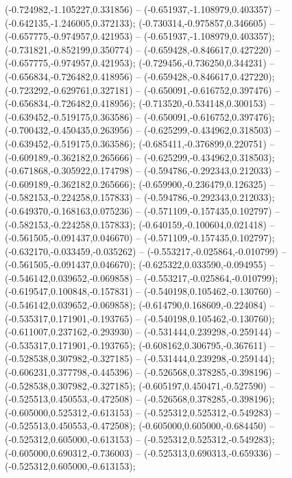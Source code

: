  (-0.724982,-1.105227,0.331856) -- (-0.651937,-1.108979,0.403357) -- (-0.642135,-1.246005,0.372133);
 (-0.730314,-0.975857,0.346605) -- (-0.657775,-0.974957,0.421953) -- (-0.651937,-1.108979,0.403357);
 (-0.731821,-0.852199,0.350774) -- (-0.659428,-0.846617,0.427220) -- (-0.657775,-0.974957,0.421953);
 (-0.729456,-0.736250,0.344231) -- (-0.656834,-0.726482,0.418956) -- (-0.659428,-0.846617,0.427220);
 (-0.723292,-0.629761,0.327181) -- (-0.650091,-0.616752,0.397476) -- (-0.656834,-0.726482,0.418956);
 (-0.713520,-0.534148,0.300153) -- (-0.639452,-0.519175,0.363586) -- (-0.650091,-0.616752,0.397476);
 (-0.700432,-0.450435,0.263956) -- (-0.625299,-0.434962,0.318503) -- (-0.639452,-0.519175,0.363586);
 (-0.685411,-0.376899,0.220751) -- (-0.609189,-0.362182,0.265666) -- (-0.625299,-0.434962,0.318503);
 (-0.671868,-0.305922,0.174798) -- (-0.594786,-0.292343,0.212033) -- (-0.609189,-0.362182,0.265666);
 (-0.659900,-0.236479,0.126325) -- (-0.582153,-0.224258,0.157833) -- (-0.594786,-0.292343,0.212033);
 (-0.649370,-0.168163,0.075236) -- (-0.571109,-0.157435,0.102797) -- (-0.582153,-0.224258,0.157833);
 (-0.640159,-0.100604,0.021418) -- (-0.561505,-0.091437,0.046670) -- (-0.571109,-0.157435,0.102797);
 (-0.632170,-0.033459,-0.035262) -- (-0.553217,-0.025864,-0.010799) -- (-0.561505,-0.091437,0.046670);
 (-0.625322,0.033590,-0.094955) -- (-0.546142,0.039652,-0.069858) -- (-0.553217,-0.025864,-0.010799);
 (-0.619547,0.100848,-0.157831) -- (-0.540198,0.105462,-0.130760) -- (-0.546142,0.039652,-0.069858);
 (-0.614790,0.168609,-0.224084) -- (-0.535317,0.171901,-0.193765) -- (-0.540198,0.105462,-0.130760);
 (-0.611007,0.237162,-0.293930) -- (-0.531444,0.239298,-0.259144) -- (-0.535317,0.171901,-0.193765);
 (-0.608162,0.306795,-0.367611) -- (-0.528538,0.307982,-0.327185) -- (-0.531444,0.239298,-0.259144);
 (-0.606231,0.377798,-0.445396) -- (-0.526568,0.378285,-0.398196) -- (-0.528538,0.307982,-0.327185);
 (-0.605197,0.450471,-0.527590) -- (-0.525513,0.450553,-0.472508) -- (-0.526568,0.378285,-0.398196);
 (-0.605000,0.525312,-0.613153) -- (-0.525312,0.525312,-0.549283) -- (-0.525513,0.450553,-0.472508);
 (-0.605000,0.605000,-0.684450) -- (-0.525312,0.605000,-0.613153) -- (-0.525312,0.525312,-0.549283);
 (-0.605000,0.690312,-0.736003) -- (-0.525313,0.690313,-0.659336) -- (-0.525312,0.605000,-0.613153);
